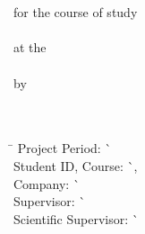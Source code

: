 
\begin{titlepage}

\begin{minipage}{\textwidth}
		\vspace{-2cm}
		\noindent
		\hfill
\end{minipage}

\enlargethispage{20mm}

\sffamily
\begin{center}
    \vspace*{24mm}  {\large\textbf{\thetitle}}       \\
    \vspace*{12mm}  {\large\textbf{\thethesis}}        \\
    \vspace*{24mm}   for the course of study         \\
    \vspace*{3mm}   {\large\textbf{\thecourseofstudies}} \\
    \vspace*{3mm}   at the                         \\
    \vspace*{3mm}   {\large\textbf{\theuniversity}}  \\
    \vspace*{12mm}  by                              \\
    \vspace*{3mm}   {\large\textbf{\theauthor}}      \\
    \vspace*{12mm}  \thedate \\

\vfill

\begin{minipage}{\textwidth}

\begin{tabbing}
	\hspace{1.85cm} \= \kill
	Project Period: \` \thetimeperiod \\[1.5mm]
	Student ID, Course: \` \thestudentnr, \thecourse\\[1.5mm]
	Company: \` \thecompany\\[1.5mm]
	Supervisor: \` \thesupervisor\\[1.5mm]
	Scientific Supervisor: \` \thescientificsupervisor\\[1.5mm]

\end{tabbing}
\end{minipage}

\end{center}

\end{titlepage}